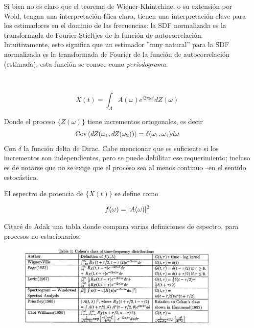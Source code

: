 Si bien no es claro que el teorema de Wiener-Khintchine, o su extensi\'on por Wold, tengan una
interpretaci\'on f\'sica clara, tienen una interpretaci\'on clave para los estimadores en el
dominio de las frecuencias:
la SDF normalizada es la transformada de Fourier-Stieltjes de la 
funci\'on de autocorrelaci\'on.
Intuitivamente, esto significa que un estimador ''muy natural'' para la SDF normalizada
es la transformada de Fourier de la funci\'on de autocorrelaci\'on (estimada);
esta funci\'on se conoce como \textit{periodograma}.

\



\begin{equation*}
X(t) = \int_{\Lambda} A(\omega) e^{i 2\pi \omega t} dZ(\omega)
\end{equation*}

Donde el proceso $\{ Z(\omega) \}$ tiene incrementos ortogonales, es decir 
\begin{equation*}
\mathrm{Cov}\left( dZ(\omega_1,dZ(\omega_2)) \right) = \delta(\omega_1,\omega_1) d\omega
\end{equation*}
Con $\delta$ la funci\'on delta de Dirac. Cabe mencionar que es suficiente si los incrementos
son independientes, pero se puede debilitar ese requerimiento; incluso es de notarse que no
se exige que el proceso sea al menos continuo --en el sentido estoc\'astico.

El espectro de potencia de $\{X(t)\}$ se define como

\begin{equation*}
f(\omega) = \lvert A(\omega) \rvert^{2}
\end{equation*}

Citar\'e de Adak \cite{Adak98} una tabla donde compara varias definiciones de espectro, para
procesos no-estacionarios.

\begin{figure}
\centering
\includegraphics[width=0.9\textwidth]{tabla.png} 
\end{figure}

